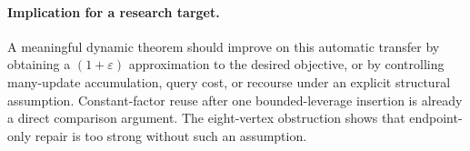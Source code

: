 \documentclass[11pt]{article}
\begin{document}
\paragraph{Implication for a research target.}
A meaningful dynamic theorem should improve on this automatic transfer
by obtaining a $(1+\varepsilon)$ approximation to the desired objective,
or by controlling many-update accumulation, query cost, or recourse
under an explicit structural assumption. Constant-factor reuse after
one bounded-leverage insertion is already a direct comparison argument.
The eight-vertex obstruction shows that endpoint-only repair is too
strong without such an assumption.
\end{document}
